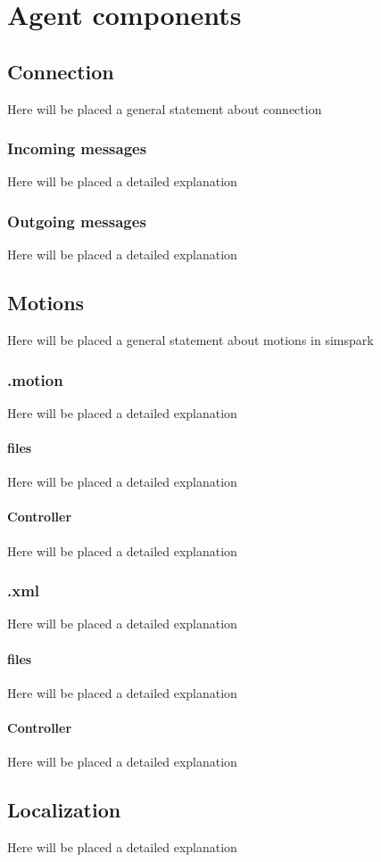 \chapter{Agent components}
\label{Our approach}

\section{Connection}
Here will be placed a general statement about connection
\subsection{Incoming messages}
Here will be placed a detailed explanation
\subsection{Outgoing messages}
Here will be placed a detailed explanation

\section{Motions}
Here will be placed a general statement about motions in simspark
\subsection{.motion}
Here will be placed a detailed explanation
\subsubsection{files}
Here will be placed a detailed explanation
\subsubsection{Controller}
Here will be placed a detailed explanation
\subsection{.xml}
Here will be placed a detailed explanation
\subsubsection{files}
Here will be placed a detailed explanation
\subsubsection{Controller}
Here will be placed a detailed explanation
\section{Localization}
Here will be placed a detailed explanation
